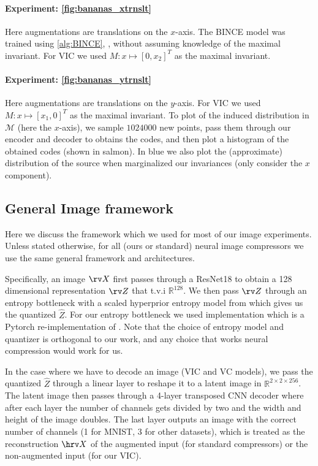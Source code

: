 \documentclass[final]{article}
\begin{document}
\paragraph{Experiment: \cref{fig:bananas_xtrnslt}}
Here augmentations are translations on the $x$-axis.
The BINCE model was trained using \cref{alg:BINCE}, \ie , without assuming knowledge of the maximal invariant.
For VIC we used $M : x \mapsto [0,x_2]^T$ as the maximal invariant.

\paragraph{Experiment: \cref{fig:bananas_ytrnslt}}
Here augmentations are translations on the $y$-axis.
For VIC we used $M : x \mapsto [x_1,0]^T$ as the maximal invariant.
To plot of the induced distribution in $\mathcal{M}$ (here the $x$-axis), we sample $1024000$ new points, pass them through our encoder and decoder to obtains the codes, and then plot a histogram of the obtained codes (shown in salmon).
In blue we also plot the (approximate) distribution of the source when marginalized our invariances (\ie only consider the $x$ component).

\subsection{General Image framework}
\label{appx:reproducability_general}

Here we discuss the framework which we used for most of our image experiments. Unless stated otherwise, for all (ours or standard) neural image compressors we use the same general framework and architectures.

Specifically, an image $\rv X$ first passes through a ResNet18 \cite{he_deep_2016} to obtain a 128 dimensional representation $\rv Z$ that t.v.i $\mathbb{R}^{128}$.
We then pass $\rv Z$ through an entropy bottleneck with a scaled hyperprior entropy model from \citet{balle_variational_2018} which gives us the quantized $\hat Z$.
For our entropy bottleneck we used  implementation which is a Pytorch re-implementation of \cite{balle_variational_2018}.
Note that the choice of entropy model and quantizer is orthogonal to our work, and any choice that works neural compression would work for us.

In the case where we have to decode an image (VIC and VC models), we pass the quantized $\hat Z$ through a linear layer to reshape it to a latent image in $\mathbb{R}^{2 \times 2 \times 256}$.
The latent image then passes through a 4-layer transposed CNN decoder where after each layer the number of channels gets divided by two and the width and height of the image doubles. 
The last layer outputs an image with the correct number of channels (1 for MNIST, 3 for other datasets), which is treated as the reconstruction $\hrv X$ of the augmented input (for standard compressors) or the non-augmented input (for our VIC).
\end{document}
